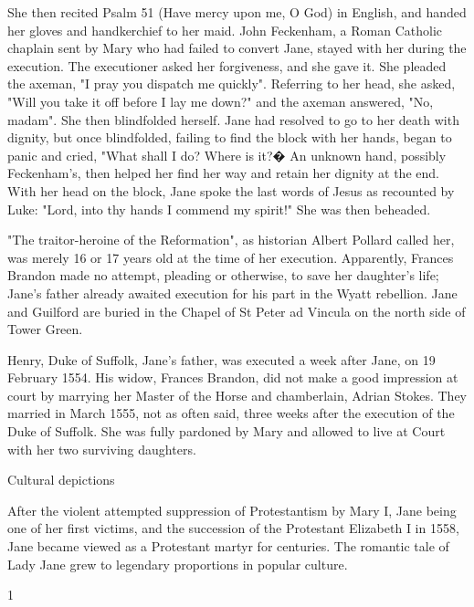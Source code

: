 \documentclass{article}
\begin{document}
She then recited Psalm 51 (Have mercy upon me, O God) in English, and handed her gloves and handkerchief to her maid. John Feckenham, a Roman Catholic chaplain sent by Mary who had failed to convert Jane, stayed with her during the execution. The executioner asked her forgiveness, and she gave it. She pleaded the axeman, "I pray you dispatch me quickly". Referring to her head, she asked, "Will you take it off before I lay me down?" and the axeman answered, "No, madam". She then blindfolded herself. Jane had resolved to go to her death with dignity, but once blindfolded, failing to find the block with her hands, began to panic and cried, "What shall I do? Where is it?�  An unknown hand, possibly Feckenham's, then helped her find her way and retain her dignity at the end. With her head on the block, Jane spoke the last words of Jesus as recounted by Luke: "Lord, into thy hands I commend my spirit!" She was then beheaded.

"The traitor-heroine of the Reformation", as historian Albert Pollard called her, was merely 16 or 17 years old at the time of her execution. Apparently, Frances Brandon made no attempt, pleading or otherwise, to save her daughter's life; Jane's father already awaited execution for his part in the Wyatt rebellion. Jane and Guilford are buried in the Chapel of St Peter ad Vincula on the north side of Tower Green.

Henry, Duke of Suffolk, Jane's father, was executed a week after Jane, on 19 February 1554. His widow, Frances Brandon, did not make a good impression at court by marrying her Master of the Horse and chamberlain, Adrian Stokes. They married in March 1555, not as often said, three weeks after the execution of the Duke of Suffolk. She was fully pardoned by Mary and allowed to live at Court with her two surviving daughters.


Cultural depictions

After the violent attempted suppression of Protestantism by Mary I, Jane being one of her first victims, and the succession of the Protestant Elizabeth I in 1558, Jane became viewed as a Protestant martyr for centuries. The romantic tale of Lady Jane grew to legendary proportions in popular culture. 







	
	
 	 
	

1

\printindex
\end{document}
